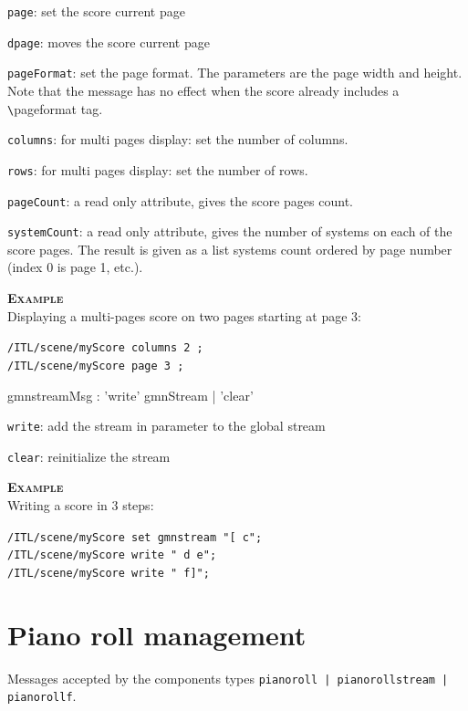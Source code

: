 \documentclass[a4paper,twoside]{report}
\newcommand{\sublevel}[1]	{\section{#1}}
\newcommand{\OSC}[1]		{\texttt{#1}}
\newcommand{\example}		{\textbf{\hspace{-1.5cm}\textbf{\textsc{Example }}}}
\let\olditemize\itemize
\let\oldenditemize\enditemize
\renewenvironment{itemize} 	{\olditemize \setlength{\itemsep}{1mm}}{\oldenditemize}
\newcommand{\sample}	[1]			{\vspace{-2mm}\begin{center}\colorbox{mygrey}{
								\begin{minipage}[t]{0.9\columnwidth} 
								{\small \texttt{#1}}
								\end{minipage}}\end{center}}
\begin{document}
\begin{itemize}
\item \OSC{page}: set the score current page
\item \OSC{dpage}: moves the score current page
\item \OSC{pageFormat}: set the page format. The parameters are the page width and height. Note that the message has no effect when the score already includes a \verb+\+pageformat tag.
\item \OSC{columns}: for multi pages display: set the number of columns.
\item \OSC{rows}: for multi pages display: set the number of rows.
\item \OSC{pageCount}:  a read only attribute, gives the score pages count.
\item \OSC{systemCount}:  a read only attribute, gives the number of systems on each of the score pages. The result is given as a list systems count ordered by page number (index 0 is page 1, etc.).
\end{itemize}


\example \\
Displaying a multi-pages score on two pages starting at page 3:
\sample{/ITL/scene/myScore columns 2 ;\\
/ITL/scene/myScore page 3 ;
}


\begin{rail}
gmnstreamMsg :      'write' gmnStream
				| 'clear' 
\end{rail}

\begin{itemize}
\item \OSC{write}: add the stream in parameter to the global stream
\item \OSC{clear}: reinitialize the stream
\end{itemize}


\example \\
Writing a score in 3 steps:
\sample{/ITL/scene/myScore set gmnstream "[ c"; \\
/ITL/scene/myScore write " d e";\\
/ITL/scene/myScore write " f]";
}


\sublevel{Piano roll management}
\label{pianoroll}

Messages accepted by the components types \OSC{pianoroll | pianorollstream | pianorollf}.
\end{document}

